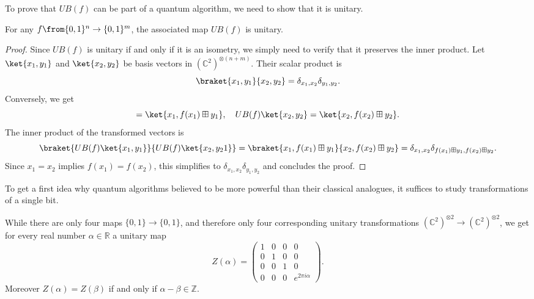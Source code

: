 \documentclass[a4paper,oneside, 12pt]{amsart}
\begin{document}
To prove that \(UB(f)\) can be part of a quantum algorithm, we need to show that it is unitary.

\begin{lemma}\label{lem:associated-unitary-is-unitary}
  For any \( f \from \{0,1\}^n \to \{0,1\}^m \), the associated map \( UB(f) \) is unitary.
\end{lemma}
\begin{proof}
  Since \(UB(f)\) is unitary if and only if it is an isometry, we simply need to verify that it preserves the inner product.
  Let \( \ket{x_1, y_1} \) and \( \ket{x_2, y_2} \) be basis vectors in \( (\mathbb{C}^2)^{\otimes (n+m)} \).
  Their scalar product is
  \begin{equation*}
    \braket{x_1, y_1}{x_2, y_2} = \delta_{x_1,x_2} \delta_{y_1,y_2}.
  \end{equation*}
  Conversely, we get
  \begin{equation*}
    = \ket{x_1, f(x_1) \boxplus y_1}, \quad UB(f)\ket{x_2, y_2} = \ket{x_2, f(x_2) \boxplus y_2}.
  \end{equation*}
  The inner product of the transformed vectors is
  \begin{equation*}
    \braket{UB(f)\ket{x_1, y_1}}{UB(f)\ket{x_2, y_21}}
    = \braket{x_1, f(x_1) \boxplus y_1}{x_2, f(x_2) \boxplus y_2}
    = \delta_{x_1,x_2} \delta_{f(x_1) \boxplus y_1, f(x_2) \boxplus y_2}.
  \end{equation*}
  Since \( x_1 = x_2 \) implies \( f(x_1) = f(x_2) \), this simplifies to \(\delta_{x_1,x_2} \delta_{y_1,y_2}\) and concludes the proof.
\end{proof}

To get a first idea why quantum algorithms believed to be more powerful than their classical analogues, it suffices to study transformations of a single bit.

\begin{remark}\label{rmk:only-few-trafos-are-quantum}
  While there are only four maps \(\{0,1\}\to\{0,1\}\), and therefore only four corresponding unitary transformations \( (\mathbb{C}^{2})^{\otimes 2} \to ( \mathbb{C}^{2})^{\otimes 2}\), we get for every real number \(\alpha \in \mathbb{R}\) a unitary map
  \begin{equation*}
    Z(\alpha) =
    \begin{pmatrix}
      1 & 0 & 0 & 0 \\
      0 & 1 & 0 & 0 \\
      0 & 0 & 1 & 0 \\
      0 & 0 & 0 & e^{2\pi i \alpha}
    \end{pmatrix}.
  \end{equation*}
  Moreover \( Z(\alpha) = Z(\beta)\) if and only if \(\alpha- \beta \in \mathbb{Z}\).
\end{remark}
\end{document}
